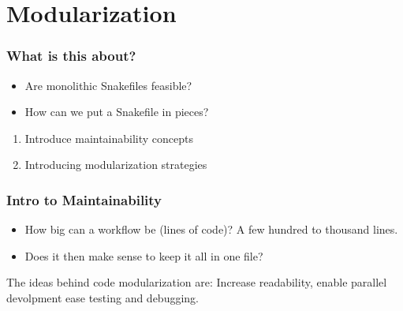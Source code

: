 \section{Modularization}
{   
}


\begin{frame}
	\frametitle{What is this about?}
	\begin{question}[Questions]
		\begin{itemize}
			\item Are monolithic Snakefiles feasible?
			\item How can we put a Snakefile in pieces?
		\end{itemize}
	\end{question}
	\begin{docs}[Objectives]
		\begin{enumerate}
			\item Introduce maintainability concepts
			\item Introducing modularization strategies
		\end{enumerate}
	\end{docs}
\end{frame}

\begin{frame}
	\frametitle{Intro to Maintainability}
	\begin{question}
		\begin{itemize}
			\item How big can a workflow be (lines of code)? \pause A few hundred to thousand lines.
		    \item Does it then make sense to keep it all in one file? 
		\end{itemize}
	\end{question}
    \pause
    \begin{hint}
    	The ideas behind code modularization are:\newline
    	Increase readability, \pause enable parallel devolpment \pause ease testing and debugging.
    \end{hint}
\end{frame}

